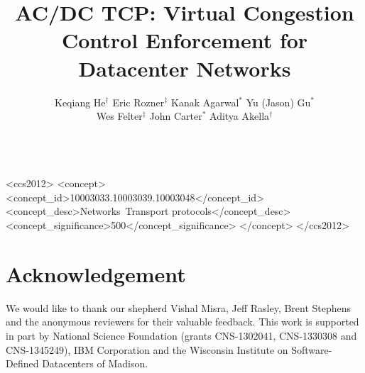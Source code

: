 \documentclass[10pt]{sig-alternate-05-2015}
\title{AC/DC TCP: Virtual Congestion Control Enforcement for Datacenter Networks}
\author{
{Keqiang He$^\dagger$ \hspace{0.2in} Eric Rozner$^\ddag$ \hspace {0.2in} Kanak Agarwal$^\ast$ \hspace {0.2in} Yu (Jason) Gu$^\ast$}\\[.2cm]
{Wes Felter$^\ddag$ \hspace{0.1in} John Carter$^\ast$ \hspace{0.1in} Aditya Akella$^\dagger$}\\\\
{\affaddr{$^\dagger$University of Wisconsin--Madison \hspace{0.15in} $^\ddag$IBM Research \hspace{0.15in} $^\ast$IBM }} %
}
\date{}
\newcommand{\crs}[1]{#1}%
\begin{document}


\maketitle



\begin{CCSXML}
<ccs2012>
<concept>
<concept_id>10003033.10003039.10003048</concept_id>
<concept_desc>Networks~Transport protocols</concept_desc>
<concept_significance>500</concept_significance>
</concept>
</ccs2012>
\end{CCSXML}

\printccsdesc






%



\section*{Acknowledgement}

\crs{We would like to thank our shepherd Vishal Misra, Jeff Rasley, Brent Stephens and
the anonymous reviewers for their valuable feedback. This
work is supported in part by National
Science Foundation (grants CNS-1302041, CNS-1330308
and CNS-1345249), IBM Corporation and the Wisconsin Institute on Software-Defined Datacenters of Madison.}

\balance
{%
\small
\setlength{\bibsep}{0.5pt}
\raggedright


}
\end{document}
